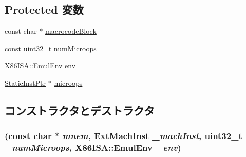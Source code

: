 \subsection*{Protected 変数}
\begin{DoxyCompactItemize}
\item 
const char $\ast$ \hyperlink{classX86ISA_1_1MacroopBase_a4bb2294ae33b6e4711ffe6fda155d6c5}{macrocodeBlock}
\item 
const \hyperlink{Type_8hh_a435d1572bf3f880d55459d9805097f62}{uint32\_\-t} \hyperlink{classX86ISA_1_1MacroopBase_a57f09f4f3d1df5e805d55d76eb6db4fd}{numMicroops}
\item 
\hyperlink{structX86ISA_1_1EmulEnv}{X86ISA::EmulEnv} \hyperlink{classX86ISA_1_1MacroopBase_aaa3a693f14966d4271ab8c5ae49e237a}{env}
\item 
\hyperlink{classRefCountingPtr}{StaticInstPtr} $\ast$ \hyperlink{classX86ISA_1_1MacroopBase_ac1f667f8d22e9d12a688bede2c0bd6f8}{microops}
\end{DoxyCompactItemize}


\subsection{コンストラクタとデストラクタ}
\hypertarget{classX86ISA_1_1MacroopBase_a7b5ebb60c18e9cda121310bce07adaad}{
\subsubsection[{MacroopBase}]{ (const char $\ast$ {\em mnem}, \/  {\bf ExtMachInst} {\em \_\-machInst}, \/  {\bf uint32\_\-t} {\em \_\-numMicroops}, \/  {\bf X86ISA::EmulEnv} {\em \_\-env})}}
\label{classX86ISA_1_1MacroopBase_a7b5ebb60c18e9cda121310bce07adaad}



